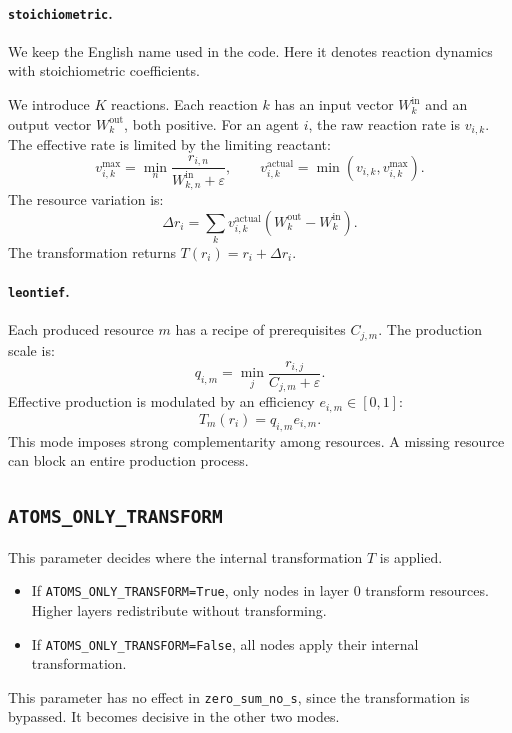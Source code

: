 \documentclass[11pt]{article}
\begin{document}
\paragraph{\texttt{stoichiometric}.}
We keep the English name used in the code. Here it denotes reaction dynamics with stoichiometric coefficients.

We introduce $K$ reactions. Each reaction $k$ has an input vector $W^{\mathrm{in}}_k$ and an output vector $W^{\mathrm{out}}_k$, both positive. For an agent $i$, the raw reaction rate is $v_{i,k}$. The effective rate is limited by the limiting reactant:
\begin{equation}
    v^{\mathrm{max}}_{i,k} = \min_n \frac{r_{i,n}}{W^{\mathrm{in}}_{k,n}+\varepsilon},
    \qquad
    v^{\mathrm{actual}}_{i,k} = \min(v_{i,k},v^{\mathrm{max}}_{i,k}).
\end{equation}
The resource variation is:
\begin{equation}
    \Delta r_i = \sum_k v^{\mathrm{actual}}_{i,k}
    \left(W^{\mathrm{out}}_k - W^{\mathrm{in}}_k\right).
\end{equation}
The transformation returns $T(r_i)=r_i+\Delta r_i$.

\paragraph{\texttt{leontief}.}
Each produced resource $m$ has a recipe of prerequisites $C_{j,m}$. The production scale is:
\begin{equation}
    q_{i,m} = \min_j \frac{r_{i,j}}{C_{j,m}+\varepsilon}.
\end{equation}
Effective production is modulated by an efficiency $e_{i,m}\in[0,1]$:
\begin{equation}
    T_m(r_i)=q_{i,m} e_{i,m}.
\end{equation}
This mode imposes strong complementarity among resources. A missing resource can block an entire production process.

\subsection{\texttt{ATOMS\_ONLY\_TRANSFORM}}

This parameter decides where the internal transformation $T$ is applied.
\begin{itemize}
    \item If \texttt{ATOMS\_ONLY\_TRANSFORM=True}, only nodes in layer $0$ transform resources. Higher layers redistribute without transforming.
    \item If \texttt{ATOMS\_ONLY\_TRANSFORM=False}, all nodes apply their internal transformation.
\end{itemize}
This parameter has no effect in \texttt{zero\_sum\_no\_s}, since the transformation is bypassed. It becomes decisive in the other two modes.
\end{document}

